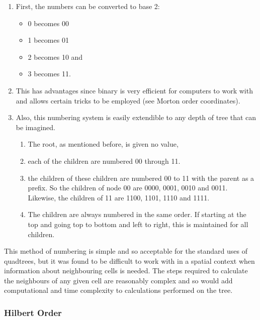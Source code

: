 \begin{enumerate}
	\item First, the numbers can be converted to base 2:
	\begin{itemize}
		\item 0 becomes 00
		\item 1 becomes 01
		\item 2 becomes 10 and
		\item 3 becomes 11.
	\end{itemize}

	\item This has advantages since binary is very efficient for computers to
	work with and allows certain tricks to be employed (see Morton order
	coordinates).

	\item Also, this numbering system is easily extendible to any depth of
	tree that can be imagined.

	\begin{enumerate}
		\item The root, as mentioned before, is given no value,
		\item each of the children are numbered {00} through 11.

		\item the children of these children are numbered 00 to 11 with the
		parent as a prefix. So the children of node 00 are 0000, 0001, 0010
		and 0011. Likewise, the children of 11 are 1100, 1101, 1110 and 1111.

		\item The children are always numbered in the same order. If starting
		at the top and going top to bottom and left to right, this is
		maintained for all children.
	\end{enumerate}
\end{enumerate}

This method of numbering is simple and so acceptable for the standard uses of
quadtrees, but it was found to be difficult to work with in a spatial context
when information about neighbouring cells is needed. The steps required to
calculate the neighbours of any given cell are reasonably complex and so would
add computational and time complexity to calculations performed on the tree.

\subsubsection{Hilbert Order}
\label{ssub:hilbert_order}

